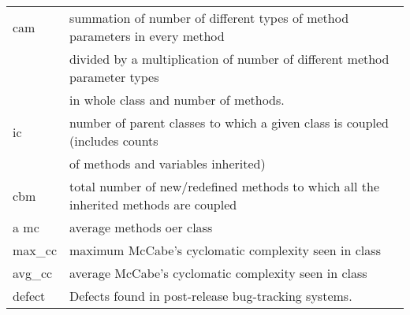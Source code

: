 \begin{table*}[!t]
{\begin{tabular}{ll}
			cam & summation of number of different
			types of method parameters in every method \\
			& divided by a multiplication
			of number of different method parameter types  \\ 
			& in whole class and
			number of methods.  \\
			
			ic &  number of parent classes to which a given
			class is coupled (includes counts \\
			& of methods and variables inherited)
			\\
			
			cbm &  total number of new/redefined methods
			to which all the inherited methods are coupled \\
			a
			mc & average methods oer class \\
			max\_cc & maximum McCabe's cyclomatic complexity seen
			in class \\
			
			avg\_cc & average McCabe's cyclomatic complexity seen
			in class \\\midrule
			defect & Defects found in post-release bug-tracking systems.\\\toprule
		\end{tabular}
	} 
\end{table*}

